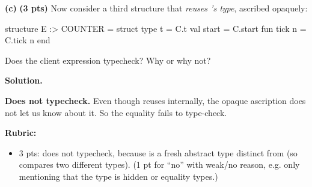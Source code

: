 \documentclass[crop=false]{standalone}
\newif\ifsol
\newenvironment{solution}
    {\par\color{solution_color}\begin{framed}\textbf{Solution.}\par}
    {\end{framed}}
\newcommand{\subpts}[1]{\textbf{(#1 pts)}}
\newcommand{\answerspace}[1]{\ifsol\else\vspace{#1}\par\fi}
\begin{document}
\vspace{0.5em}

\textbf{(c)} \subpts{3} Now consider a third structure that \emph{reuses
's type}, ascribed opaquely:

\begin{codeblock}
  structure E :> COUNTER =
    struct type t = C.t  val start = C.start  fun tick n = C.tick n end
\end{codeblock}

Does the client expression  typecheck? Why or why
not?

\answerspace{3cm}

\begin{solution}
\textbf{Does not typecheck.} Even though  reuses 
internally, the opaque ascription does not let us know about it. So
the equality fails to type-check.

\textbf{Rubric:}
\begin{itemize}
  \item 3 pts: does not typecheck, because  is a fresh abstract
    type distinct from  (so \code{=} compares two different
    types). (1 pt for ``no'' with weak/no reason, e.g. only mentioning
    that the type is hidden or equality types.)
\end{itemize}
\end{solution}
\end{document}
